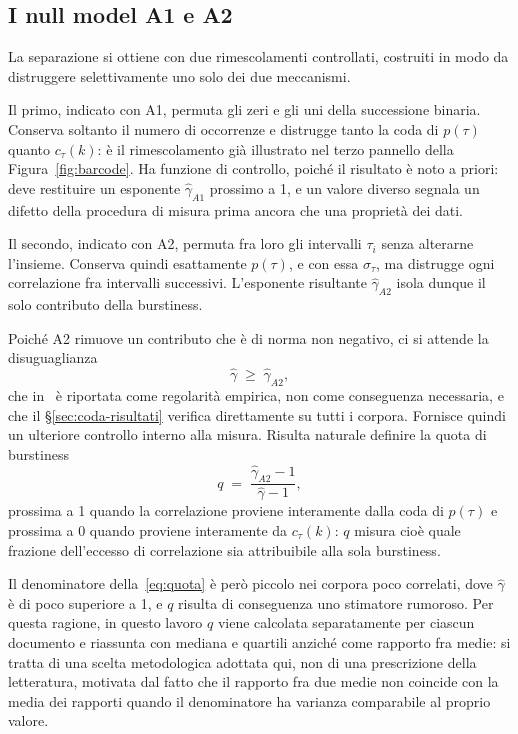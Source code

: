 \subsection{I null model A1 e A2}
\label{sec:null}

La separazione si ottiene con due rimescolamenti controllati, costruiti in modo
da distruggere selettivamente uno solo dei due meccanismi.

Il primo, indicato con A1, permuta gli zeri e gli uni della successione binaria.
Conserva soltanto il numero di occorrenze e distrugge tanto la coda di $p(\tau)$
quanto $c_\tau(k)$: è il rimescolamento già illustrato nel terzo pannello della
Figura~\ref{fig:barcode}. Ha funzione di controllo, poiché il risultato è noto a
priori: deve restituire un esponente $\hat\gamma_{A1}$ prossimo a 1, e un valore
diverso segnala un difetto della procedura di misura prima ancora che una
proprietà dei dati.

Il secondo, indicato con A2, permuta fra loro gli intervalli $\tau_i$ senza
alterarne l'insieme. Conserva quindi esattamente $p(\tau)$, e con essa
$\sigma_\tau$, ma distrugge ogni correlazione fra intervalli successivi.
L'esponente risultante $\hat\gamma_{A2}$ isola dunque il solo contributo della
burstiness.

Poiché A2 rimuove un contributo che è di norma non negativo, ci si attende la
disuguaglianza
\begin{equation}
  \hat\gamma \;\ge\; \hat\gamma_{A2},
  \label{eq:disug1}
\end{equation}
che in~\cite{altmann2012} è riportata come regolarità empirica, non come
conseguenza necessaria, e che il §\ref{sec:coda-risultati} verifica
direttamente su tutti i corpora. Fornisce quindi un ulteriore controllo interno
alla misura. Risulta naturale
definire la quota di burstiness
\begin{equation}
  q \;=\; \frac{\hat\gamma_{A2} - 1}{\hat\gamma - 1},
  \label{eq:quota}
\end{equation}
prossima a 1 quando la correlazione proviene interamente dalla coda di $p(\tau)$
e prossima a 0 quando proviene interamente da $c_\tau(k)$: $q$ misura cioè quale
frazione dell'eccesso di correlazione sia attribuibile alla sola burstiness.

Il denominatore della~\eqref{eq:quota} è però piccolo nei corpora poco
correlati, dove $\hat\gamma$ è di poco superiore a 1, e $q$ risulta di
conseguenza uno stimatore rumoroso. Per questa ragione, in questo lavoro $q$
viene calcolata separatamente per ciascun documento e riassunta con mediana e
quartili anziché come rapporto fra medie: si tratta di una scelta metodologica
adottata qui, non di una prescrizione della letteratura, motivata dal fatto che
il rapporto fra due medie non coincide con la media dei rapporti quando il
denominatore ha varianza comparabile al proprio valore.

